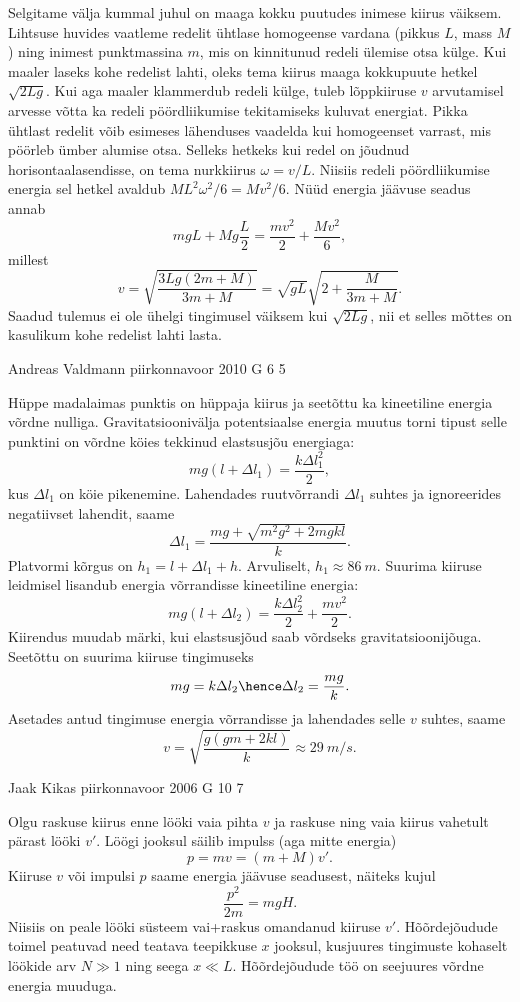 \documentclass[11pt, twoside]{article}
\begin{document}
{{\ifSolution
Selgitame välja kummal juhul on maaga kokku puutudes inimese kiirus väiksem. Lihtsuse huvides vaatleme redelit ühtlase
homogeense vardana (pikkus $L$, mass $M$) ning inimest punktmassina $m$, mis on kinnitunud redeli ülemise otsa külge. Kui maaler laseks kohe redelist lahti, oleks tema kiirus maaga kokkupuute hetkel $\sqrt{2Lg}$. Kui aga maaler klammerdub redeli külge, tuleb lõppkiiruse $v$ arvutamisel arvesse võtta ka redeli pöördliikumise tekitamiseks kuluvat energiat. Pikka ühtlast redelit võib esimeses lähenduses vaadelda kui homogeenset varrast, mis pöörleb ümber alumise otsa. Selleks hetkeks kui redel on jõudnud horisontaalasendisse, on tema nurkkiirus $\omega=v/L$. Niisiis redeli pöördliikumise energia sel hetkel avaldub $ML^2\omega^2/6=Mv^2/6$. Nüüd energia jäävuse seadus annab
\[
mgL+Mg\frac{L}{2}=\frac{mv^2}{2} +\frac{Mv^2}{6},
\]
millest
\[
v=\sqrt{\frac{3Lg(2m+M)}{3m+M}}=\sqrt{gL}\sqrt{2+\frac{M}{3m+M}}.
\]
Saadud tulemus ei ole ühelgi tingimusel väiksem kui $\sqrt{2Lg}$, nii et selles mõttes on kasulikum kohe redelist lahti lasta.
\fi
}

{Andreas Valdmann} %
{piirkonnavoor} %
{2010} %
{G 6} %
{5} %
{

\ifSolution
Hüppe madalaimas punktis on hüppaja kiirus ja seetõttu ka kineetiline energia võrdne nulliga. Gravitatsioonivälja potentsiaalse energia muutus torni tipust selle punktini on võrdne köies tekkinud elastsusjõu energiaga:
\[
mg(l+\Delta l_1)=\frac{k\Delta l_1^2}{2},
\]
kus $\Delta l_1$ on köie pikenemine. Lahendades ruutvõrrandi $\Delta l_1$ suhtes ja ignoreerides negatiivset lahendit, saame
\[
\Delta l_1=\frac{mg+\sqrt{m^2g^2+2mgkl}}{k}.
\]
Platvormi kõrgus on $h_1=l+\Delta l_1+h$.
Arvuliselt, $h_1\approx \SI{86}{m}$.
Suurima kiiruse leidmisel lisandub energia võrrandisse kineetiline energia:
\[
mg(l+\Delta l_2)=\frac{k\Delta l_2^2}{2}+\frac{mv^2}{2}.
\]
Kiirendus muudab märki, kui elastsusjõud saab võrdseks gravitatsioonijõuga. Seetõttu on suurima kiiruse tingimuseks
\[
mg=k\Delta l_2 \hence \Delta l_2=\frac{mg}{k}.
\]
Asetades antud tingimuse energia võrrandisse ja lahendades selle $v$ suhtes, saame
\[
v=\sqrt{\frac{g(gm+2kl)}{k}} \approx \SI{29}{m/s}.
\]
\fi
}

{Jaak Kikas} %
{piirkonnavoor} %
{2006} %
{G 10} %
{7} %
{

\ifSolution
Olgu raskuse kiirus enne lööki vaia pihta $v$ ja raskuse ning vaia kiirus vahetult
pärast lööki $v'$. Löögi jooksul säilib impulss (aga mitte energia) 
\[
p = mv = (m + M)v'.
\] 
Kiiruse $v$ või impulsi $p$ saame energia jäävuse seadusest, näiteks kujul
\[
\frac{p^2}{2m} = mgH.
\]
Niisiis on peale lööki süsteem vai+raskus omandanud kiiruse $v'$. Hõõrdejõudude toimel peatuvad need teatava teepikkuse $x$ jooksul, kusjuures tingimuste kohaselt löökide arv $N \gg 1$ ning seega $x \ll L$. Hõõrdejõudude töö on seejuures võrdne energia muuduga.

}}
\end{document}
